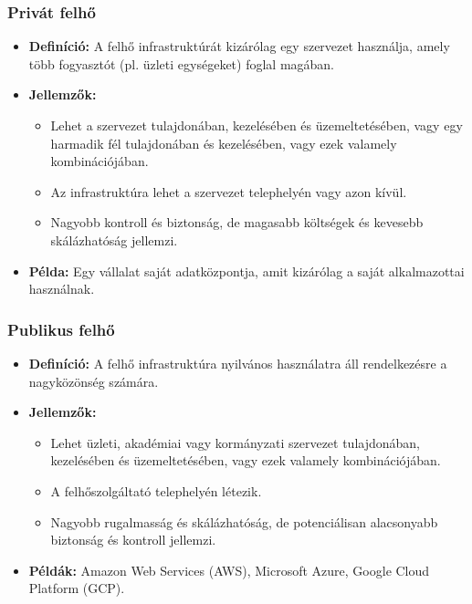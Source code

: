 \documentclass[a4paper,12pt]{article}
\begin{document}
    \subsubsection{Privát felhő}

    \begin{itemize}
        \item \textbf{Definíció:} A felhő infrastruktúrát kizárólag egy szervezet használja, amely több fogyasztót (pl. üzleti egységeket) foglal magában.

        \item \textbf{Jellemzők:}
        \begin{itemize}
            \item Lehet a szervezet tulajdonában, kezelésében és üzemeltetésében, vagy egy harmadik fél tulajdonában és kezelésében, vagy ezek valamely kombinációjában.
            \item Az infrastruktúra lehet a szervezet telephelyén vagy azon kívül.
            \item Nagyobb kontroll és biztonság, de magasabb költségek és kevesebb skálázhatóság jellemzi.
        \end{itemize}

        \item \textbf{Példa:} Egy vállalat saját adatközpontja, amit kizárólag a saját alkalmazottai használnak.
    \end{itemize}

    \subsubsection{Publikus felhő}

    \begin{itemize}
        \item \textbf{Definíció:} A felhő infrastruktúra nyilvános használatra áll rendelkezésre a nagyközönség számára.

        \item \textbf{Jellemzők:}
        \begin{itemize}
            \item Lehet üzleti, akadémiai vagy kormányzati szervezet tulajdonában, kezelésében és üzemeltetésében, vagy ezek valamely kombinációjában.
            \item A felhőszolgáltató telephelyén létezik.
            \item Nagyobb rugalmasság és skálázhatóság, de potenciálisan alacsonyabb biztonság és kontroll jellemzi.
        \end{itemize}

        \item \textbf{Példák:} Amazon Web Services (AWS), Microsoft Azure, Google Cloud Platform (GCP).
    \end{itemize}
\end{document}
